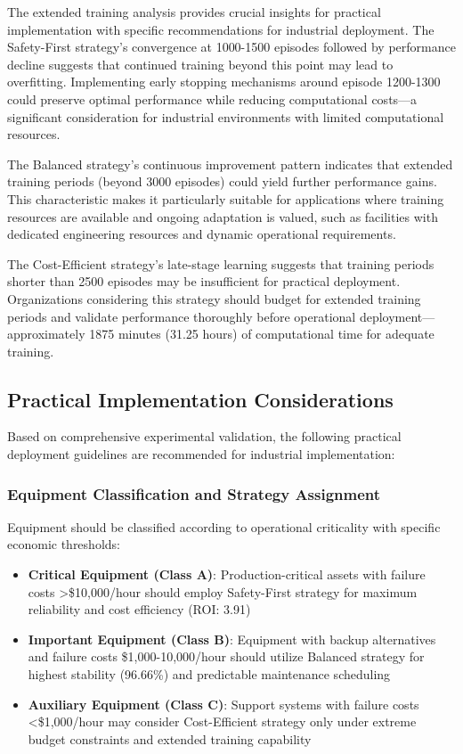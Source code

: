\documentclass[twocolumn]{article}
\begin{document}
The extended training analysis provides crucial insights for practical implementation with specific recommendations for industrial deployment. The Safety-First strategy's convergence at 1000-1500 episodes followed by performance decline suggests that continued training beyond this point may lead to overfitting. Implementing early stopping mechanisms around episode 1200-1300 could preserve optimal performance while reducing computational costs—a significant consideration for industrial environments with limited computational resources.

The Balanced strategy's continuous improvement pattern indicates that extended training periods (beyond 3000 episodes) could yield further performance gains. This characteristic makes it particularly suitable for applications where training resources are available and ongoing adaptation is valued, such as facilities with dedicated engineering resources and dynamic operational requirements.

The Cost-Efficient strategy's late-stage learning suggests that training periods shorter than 2500 episodes may be insufficient for practical deployment. Organizations considering this strategy should budget for extended training periods and validate performance thoroughly before operational deployment—approximately 1875 minutes (31.25 hours) of computational time for adequate training.

\subsection{Practical Implementation Considerations}

Based on comprehensive experimental validation, the following practical deployment guidelines are recommended for industrial implementation:

\subsubsection{Equipment Classification and Strategy Assignment}

Equipment should be classified according to operational criticality with specific economic thresholds:

\begin{itemize}
\item \textbf{Critical Equipment (Class A)}: Production-critical assets with failure costs >\$10,000/hour should employ Safety-First strategy for maximum reliability and cost efficiency (ROI: 3.91)
\item \textbf{Important Equipment (Class B)}: Equipment with backup alternatives and failure costs \$1,000-10,000/hour should utilize Balanced strategy for highest stability (96.66\%) and predictable maintenance scheduling
\item \textbf{Auxiliary Equipment (Class C)}: Support systems with failure costs <\$1,000/hour may consider Cost-Efficient strategy only under extreme budget constraints and extended training capability
\end{itemize}
\end{document}

